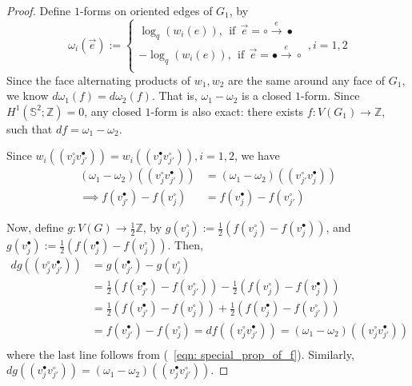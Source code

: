 \documentclass[11pt]{amsart}
\theoremstyle{definition}
\theoremstyle{remark}
\numberwithin{equation}{section}
\begin{document}
\begin{proof}
    Define $1$-forms on oriented edges of $G_1$, by $$\omega_i(\Vec{e}):=\begin{cases}
        \log_q(w_i(e)), \:\:\text{if}\:\:\Vec{e}=\circ\xrightarrow[]{e}\bullet\\
        -\log_q(w_i(e)),
        \:\:\text{if}\:\:\Vec{e}=\bullet\xrightarrow[]{e}\circ\\
    \end{cases}, i=1,2$$ 
    Since the face alternating products of $w_1,w_2$ are the same around any face of $G_1$, we know $d\omega_1(f) =d\omega_2(f)$. That is, $\omega_1-\omega_2$ is a closed $1$-form. Since $H^1(\mathbb{S}^2;\mathbb{Z})=0$, any closed $1$-form is also exact: there exists $f: V(G_1)\rightarrow \mathbb{Z}$, such that $df = \omega_1-\omega_2$. 

    Since $w_i((v^\circ_jv^\bullet_{j'}))=w_i((v^\bullet_jv^\circ_{j'})), i=1,2$, we have 
    \begin{equation}\label{eqn: special_prop_of_f}
        \begin{split}
            (\omega_1-\omega_2)((v^\circ_jv^\bullet_{j'})) &= (\omega_1-\omega_2)((v^\circ_{j'}v^\bullet_{j}))\\
            \implies f(v^\bullet_{j'})-f(v^\circ_j) &= f(v^\bullet_{j})-f(v^\circ_{j'})
        \end{split}
    \end{equation}
    
    Now, define $g:V(G)\rightarrow \frac{1}{2}\mathbb{Z}$, by $g(v^\circ_j) := \frac{1}{2}(f(v^\circ_j)-f(v^\bullet_j))$, and $g(v^\bullet_j) := \frac{1}{2}(f(v^\bullet_j)-f(v^\circ_j))$. Then,
    \begin{equation*}
        \begin{split}
            dg((v^\circ_jv^\bullet_{j'}))&= g(v^\bullet_{j'})-g(v^\circ_j)\\
            &= \frac{1}{2}(f(v^\bullet_{j'})-f(v^\circ_{j'}))-\frac{1}{2}(f(v^\circ_j)-f(v^\bullet_j))\\
            &= \frac{1}{2}(f(v^\bullet_{j'})-f(v^\circ_j))+\frac{1}{2}(f(v^\bullet_j)-f(v^\circ_{j'}))\\
            &= f(v^\bullet_{j'})-f(v^\circ_j) = df((v^\circ_jv^\bullet_{j'}))=(\omega_1-\omega_2)((v^\circ_jv^\bullet_{j'}))\\
        \end{split}
    \end{equation*}
    where the last line follows from (~\ref{eqn: special_prop_of_f}). Similarly, $dg((v^\bullet_jv^\circ_{j'})) = (\omega_1-\omega_2)((v^\bullet_jv^\circ_{j'}))$. 


\end{proof}
\end{document}
